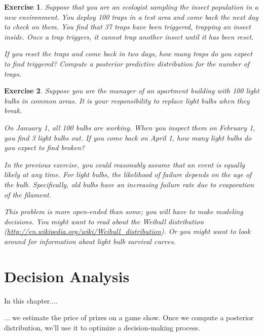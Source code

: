 \documentclass[12pt]{book}
\theoremstyle{exercise}
\newtheorem{exercise}{Exercise}[chapter]
\begin{document}
\begin{exercise}

Suppose that you are an ecologist sampling the insect population in
a new environment.  You deploy 100 traps in a test area and come back
the next day to check on them.  You find that 37 traps have been
triggered, trapping an insect inside.  Once a trap triggers, it
cannot trap another insect until it has been reset.

If you reset the traps and come back in two days, how many traps
do you expect to find triggered?  Compute a posterior predictive
distribution for the number of traps.

\end{exercise}


\begin{exercise}

Suppose you are the manager of an apartment building with
100 light bulbs in common areas.  It is your responsibility
to replace light bulbs when they break.

On January 1, all 100 bulbs are working.  When you inspect
them on February 1, you find 3 light bulbs out.  If you
come back on April 1, how many light bulbs do you expect to
find broken?

In the previous exercise, you could reasonably assume that an event is
equally likely at any time.  For light bulbs, the likelihood of
failure depends on the age of the bulb.  Specifically, old bulbs
have an increasing failure rate due to evaporation of the filament.

This problem is more open-ended than some; you will have to make
modeling decisions.  You might want to read about the Weibull
distribution
(\url{http://en.wikipedia.org/wiki/Weibull_distribution}).
Or you might want to look around for information about
light bulb survival curves.

\end{exercise}



\chapter{Decision Analysis}
\label{decisionanalysis}

In this chapter....

... we estimate the price of prizes on a game show.
Once we compute a posterior distribution, we'll use it to optimize a decision-making process.
\end{document}

